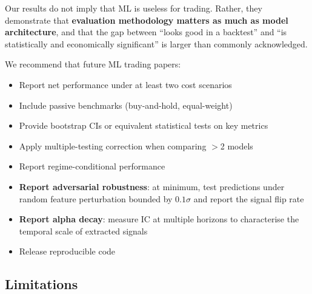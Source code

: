 \documentclass[preprint,review,12pt]{elsarticle}
\begin{document}
Our results do not imply that ML is useless for trading.
Rather, they demonstrate that \textbf{evaluation methodology matters as much as model architecture}, and that the gap between ``looks good in a backtest'' and ``is statistically and economically significant'' is larger than commonly acknowledged.

We recommend that future ML trading papers:
\begin{itemize}[leftmargin=1.4em]
  \item Report net performance under at least two cost scenarios
  \item Include passive benchmarks (buy-and-hold, equal-weight)
  \item Provide bootstrap CIs or equivalent statistical tests on key metrics
  \item Apply multiple-testing correction when comparing $>$2 models
  \item Report regime-conditional performance
  \item \textbf{Report adversarial robustness}: at minimum, test predictions under random feature perturbation bounded by $0.1\sigma$ and report the signal flip rate
  \item \textbf{Report alpha decay}: measure IC at multiple horizons to characterise the temporal scale of extracted signals
  \item Release reproducible code
\end{itemize}

\subsection{Limitations}
\end{document}
